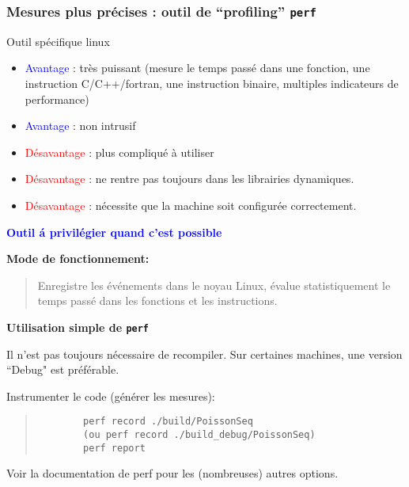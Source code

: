 \documentclass{beamer}
\begin{document}
\begin{frame}
	\frametitle{Mesures plus pr\'ecises : outil de ``profiling'' {\tt perf}}
		
	\vfill
	Outil spécifique linux
	
	\begin{itemize}
		\item \textcolor{blue}{Avantage} : tr\`es puissant (mesure le temps pass\'e dans une fonction, une instruction C/C++/fortran, une instruction binaire, multiples indicateurs de performance)
		\item \textcolor{blue}{Avantage} : non intrusif
		\item \textcolor{red}{D\'esavantage} : plus compliqu\'e \`a utiliser
		\item \textcolor{red}{D\'esavantage} : ne rentre pas toujours dans les librairies dynamiques.
		\item \textcolor{red}{D\'esavantage} : n\'ecessite que la machine soit configur\'ee  correctement.
	\end{itemize}
	\vfill
	\textcolor{blue}{\bf Outil \'a privil\'egier quand c'est possible}
\end{frame}
\begin{frame}[fragile]
	
	{\bf 	Mode de fonctionnement:}
	\begin{quote}
		Enregistre les \'ev\'enements dans le noyau Linux, \'evalue statistiquement le temps pass\'e dans les fonctions et les instructions.
	\end{quote} 
	
	\vfill
	{\bf Utilisation simple de {\tt perf}}
	\vfill
	
	Il n'est pas toujours n\'ecessaire de recompiler. Sur certaines machines, une version ``Debug" est pr\'ef\'erable. 
	
	\vfill
	Instrumenter le code (g\'en\'erer les mesures):
	\begin{quote}
		\begin{verbatim}
		perf record ./build/PoissonSeq
		(ou perf record ./build_debug/PoissonSeq)
		perf report
		\end{verbatim}
	\end{quote} 
	
	\vfill
	Voir la documentation de perf pour les (nombreuses) autres options.
	
	\vfill
\end{frame}
\end{document}
